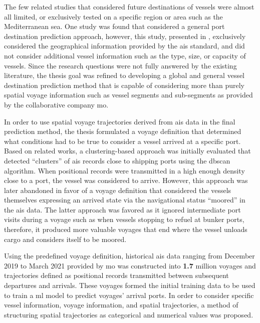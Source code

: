 The few related studies that considered future destinations of vessels were almost all limited, or exclusively tested on a specific region or area such as the Mediterranean sea. One study was found that considered a general port destination prediction approach, however, this study, presented in \cite{Zhang2020AISApproach}, exclusively considered the geographical information provided by the \acrshort{ais} standard, and did not consider additional vessel information such as the type, size, or capacity of vessels. Since the research questions were not fully answered by the existing literature, the thesis goal was refined to developing a global and general vessel destination prediction method that is capable of considering more than purely spatial voyage information such as vessel segments and sub-segments as provided by the collaborative company \acrfull{mo}.

In order to use spatial voyage trajectories derived from \acrshort{ais} data in the final prediction method, the thesis formulated a voyage definition that determined what conditions had to be true to consider a vessel arrived at a specific port. Based on related works, a clustering-based approach was initially evaluated that detected ``clusters'' of \acrshort{ais} records close to shipping ports using the \acrfull{dbscan} algorithm. When positional records were transmitted in a high enough density close to a port, the vessel was considered to arrive. However, this approach was later abandoned in favor of a voyage definition that considered the vessels themselves expressing an arrived state via the navigational status ``moored'' in the \acrshort{ais} data. The latter approach was favored as it ignored intermediate port visits during a voyage such as when vessels stopping to refuel at bunker ports, therefore, it produced more valuable voyages that end where the vessel unloads cargo and considers itself to be moored.

Using the predefined voyage definition, historical \acrshort{ais} data ranging from December 2019 to March 2021 provided by \acrshort{mo} was constructed into \textbf{1.7} million voyages and trajectories defined as positional records transmitted between subsequent departures and arrivals. These voyages formed the initial training data to be used to train a \acrfull{ml} model to predict voyages' arrival ports. In order to consider specific vessel information, voyage information, and spatial trajectories, a method of structuring spatial trajectories as categorical and numerical values was proposed.

